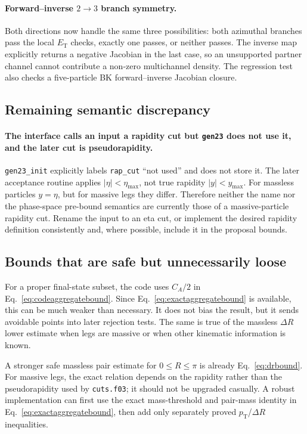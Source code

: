 \documentclass[11pt,a4paper]{article}
\newcommand{\code}[1]{\texttt{#1}}
\newcommand{\ET}{E_{\mathrm{T}}}
\newcommand{\pt}{p_{\mathrm{T}}}
\begin{document}
\paragraph{Forward--inverse $2\to3$ branch symmetry.}
Both directions now handle the same three possibilities: both azimuthal
branches pass the local $\ET$ checks, exactly one passes, or neither passes.
The inverse map explicitly returns a negative Jacobian in the last case, so an
unsupported partner channel cannot contribute a non-zero multichannel
density.  The regression test also checks a five-particle BK forward--inverse
Jacobian closure.

\subsection{Remaining semantic discrepancy}

\paragraph{The interface calls an input a rapidity cut but \code{gen23} does
not use it, and the later cut is pseudorapidity.}
\code{gen23\_init} explicitly labels \code{rap\_cut} ``not used'' and does
not store it.  The later acceptance routine applies $|\eta|<\eta_{\max}$,
not true rapidity $|y|<y_{\max}$.  For massless particles $y=\eta$, but for
massive legs they differ.  Therefore neither the name nor the phase-space
pre-bound semantics are currently those of a massive-particle rapidity cut.
Rename the input to an eta cut, or implement the desired rapidity definition
consistently and, where possible, include it in the proposal bounds.

\subsection{Bounds that are safe but unnecessarily loose}

For a proper final-state subset, the code uses $C_A/2$ in
Eq.~\eqref{eq:codeaggregatebound}.  Since Eq.~\eqref{eq:exactaggregatebound}
is available, this can be much weaker than necessary.  It does not bias the
result, but it sends avoidable points into later rejection tests.  The same is
true of the massless $\Delta R$ lower estimate when legs are massive or when
other kinematic information is known.

A stronger safe massless pair estimate for $0\le R\le\pi$ is already
Eq.~\eqref{eq:drbound}.  For massive legs, the exact relation depends on the
rapidity rather than the pseudorapidity used by \code{cuts.f03}; it should not
be upgraded casually.  A robust implementation can first use the exact
mass-threshold and pair-mass identity in Eq.~\eqref{eq:exactaggregatebound},
then add only separately proved $\pt$/$\Delta R$ inequalities.
\end{document}
